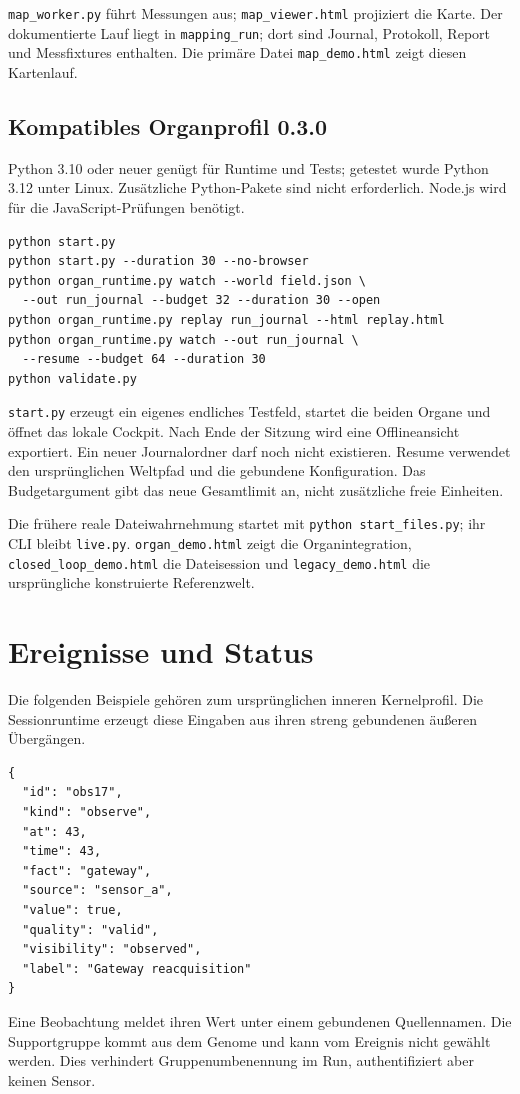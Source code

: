 \documentclass[11pt,a4paper]{article}
\newcommand{\nextsection}[2]{\clearpage{\color{accent}\small\textsf{#1}}\section{#2}}
\begin{document}
\texttt{map\_worker.py} führt Messungen aus;
\texttt{map\_viewer.html} projiziert die Karte. Der dokumentierte Lauf liegt in
\texttt{mapping\_run}; dort sind Journal, Protokoll, Report und
Messfixtures enthalten. Die primäre Datei
\texttt{map\_demo.html} zeigt diesen Kartenlauf.

\clearpage\subsection{Kompatibles Organprofil 0.3.0}
Python 3.10 oder neuer genügt für Runtime und Tests;
getestet wurde Python 3.12 unter Linux. Zusätzliche
Python-Pakete sind nicht erforderlich. Node.js wird für
die JavaScript-Prüfungen benötigt.

\begin{lstlisting}
python start.py
python start.py --duration 30 --no-browser
python organ_runtime.py watch --world field.json \
  --out run_journal --budget 32 --duration 30 --open
python organ_runtime.py replay run_journal --html replay.html
python organ_runtime.py watch --out run_journal \
  --resume --budget 64 --duration 30
python validate.py
\end{lstlisting}
\texttt{start.py} erzeugt ein eigenes endliches Testfeld,
startet die beiden Organe und öffnet das lokale Cockpit.
Nach Ende der Sitzung wird eine Offlineansicht exportiert.
Ein neuer Journalordner darf noch nicht existieren.
Resume verwendet den ursprünglichen Weltpfad und die
gebundene Konfiguration. Das Budgetargument gibt das
neue Gesamtlimit an, nicht zusätzliche freie Einheiten.



Die frühere reale Dateiwahrnehmung startet mit
\texttt{python start\_files.py}; ihr CLI bleibt
\texttt{live.py}. \texttt{organ\_demo.html} zeigt die Organintegration,
\texttt{closed\_loop\_demo.html} die Dateisession und
\texttt{legacy\_demo.html} die ursprüngliche konstruierte Referenzwelt.

\nextsection{ANHANG B / DATENFORMATE}{Ereignisse und Status}
Die folgenden Beispiele gehören zum ursprünglichen inneren
Kernelprofil. Die Sessionruntime erzeugt diese Eingaben aus
ihren streng gebundenen äußeren Übergängen.

\begin{lstlisting}
{
  "id": "obs17",
  "kind": "observe",
  "at": 43,
  "time": 43,
  "fact": "gateway",
  "source": "sensor_a",
  "value": true,
  "quality": "valid",
  "visibility": "observed",
  "label": "Gateway reacquisition"
}
\end{lstlisting}
Eine Beobachtung meldet ihren Wert unter einem gebundenen
Quellennamen. Die Supportgruppe kommt aus dem Genome und
kann vom Ereignis nicht gewählt werden. Dies verhindert
Gruppenumbenennung im Run, authentifiziert aber keinen Sensor.
\end{document}
